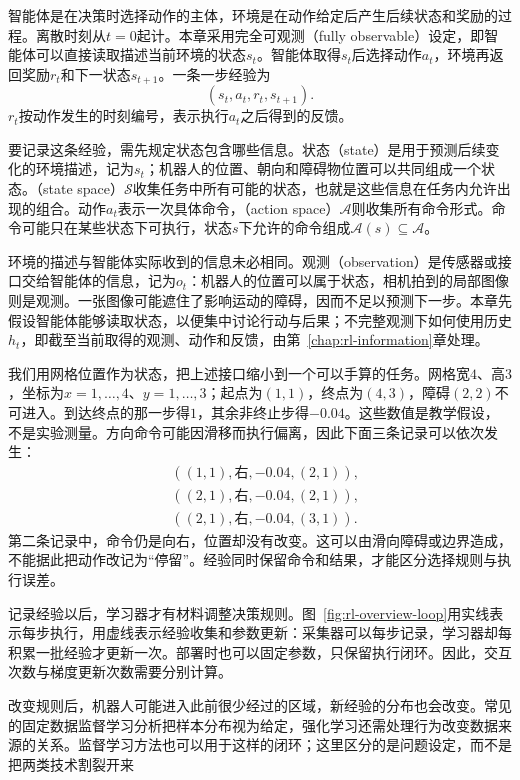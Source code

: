 \begin{definition}
  \label{def:rl-overview-interface}
  智能体是在决策时选择动作的主体，环境是在动作给定后产生后续状态和奖励的过程。离散时刻从$t=0$起计。本章采用完全可观测（fully observable）设定，即智能体可以直接读取描述当前环境的状态$s_t$。智能体取得$s_t$后选择动作$a_t$，环境再返回奖励$r_t$和下一状态$s_{t+1}$。一条一步经验为
  \[
    (s_t,a_t,r_t,s_{t+1}).
  \]
  $r_t$按动作发生的时刻编号，表示执行$a_t$之后得到的反馈。
\end{definition}

要记录这条经验，需先规定状态包含哪些信息。状态（state）是用于预测后续变化的环境描述，记为$s_t$；机器人的位置、朝向和障碍物位置可以共同组成一个状态。（state space）$\mathcal S$收集任务中所有可能的状态，也就是这些信息在任务内允许出现的组合。动作$a_t$表示一次具体命令，（action space）$\mathcal A$则收集所有命令形式。命令可能只在某些状态下可执行，状态$s$下允许的命令组成$\mathcal A(s)\subseteq\mathcal A$。

环境的描述与智能体实际收到的信息未必相同。观测（observation）是传感器或接口交给智能体的信息，记为$o_t$：机器人的位置可以属于状态，相机拍到的局部图像则是观测。一张图像可能遮住了影响运动的障碍，因而不足以预测下一步。本章先假设智能体能够读取状态，以便集中讨论行动与后果；不完整观测下如何使用历史$h_t$，即截至当前取得的观测、动作和反馈，由第~\ref{chap:rl-information}章处理。

我们用网格位置作为状态，把上述接口缩小到一个可以手算的任务。网格宽$4$、高$3$，坐标为$x=1,\ldots,4$、$y=1,\ldots,3$；起点为$(1,1)$，终点为$(4,3)$，障碍$(2,2)$不可进入。到达终点的那一步得$1$，其余非终止步得$-0.04$。这些数值是教学假设，不是实验测量。方向命令可能因滑移而执行偏离，因此下面三条记录可以依次发生：
\[
\begin{aligned}
 &((1,1),\text{右},-0.04,(2,1)),\\
 &((2,1),\text{右},-0.04,(2,1)),\\
 &((2,1),\text{右},-0.04,(3,1)).
\end{aligned}
\]
第二条记录中，命令仍是向右，位置却没有改变。这可以由滑向障碍或边界造成，不能据此把动作改记为“停留”。经验同时保留命令和结果，才能区分选择规则与执行误差。

记录经验以后，学习器才有材料调整决策规则。图~\ref{fig:rl-overview-loop}用实线表示每步执行，用虚线表示经验收集和参数更新：采集器可以每步记录，学习器却每积累一批经验才更新一次。部署时也可以固定参数，只保留执行闭环。因此，交互次数与梯度更新次数需要分别计算。

改变规则后，机器人可能进入此前很少经过的区域，新经验的分布也会改变。常见的固定数据监督学习分析把样本分布视为给定，强化学习还需处理行为改变数据来源的关系。监督学习方法也可以用于这样的闭环；这里区分的是问题设定，而不是把两类技术割裂开来


